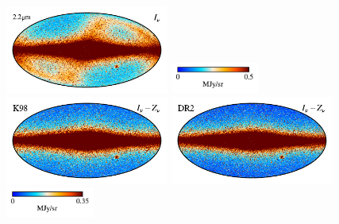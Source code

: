 \documentclass[twocolumn]{aa}
\begin{document}
\begin{figure}
    \includegraphics[height=2.90cm]{figs/compare_freq_maps/cosmoglobe_ma_02.pdf}%
    \includegraphics[width=2.90cm,angle=90]{figs/compare_freq_maps/cbar_tot_02.pdf}%
    \includegraphics[height=2.90cm]{figs/compare_freq_maps/dirbe_zsma_02.pdf}%
    \includegraphics[height=2.90cm]{figs/compare_freq_maps/cosmoglobe_zsma_02.pdf}%
    \includegraphics[width=2.90cm,angle=90]{figs/compare_freq_maps/cbar_02.pdf}%
    \\


\end{figure}
\end{document}
